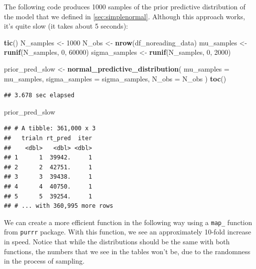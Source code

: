 \documentclass[12pt,]{krantz}
\newenvironment{Shaded}{\begin{snugshade}}{\end{snugshade}}
\newcommand{\KeywordTok}[1]{\textcolor[rgb]{0.13,0.29,0.53}{\textbf{#1}}}
\newcommand{\DataTypeTok}[1]{\textcolor[rgb]{0.13,0.29,0.53}{#1}}
\newcommand{\DecValTok}[1]{\textcolor[rgb]{0.00,0.00,0.81}{#1}}
\newcommand{\StringTok}[1]{\textcolor[rgb]{0.31,0.60,0.02}{#1}}
\newcommand{\NormalTok}[1]{#1}
\theoremstyle{definition}
\theoremstyle{definition}
\theoremstyle{definition}
\theoremstyle{remark}
\begin{document}
The following code produces 1000 samples of the prior predictive
distribution of the model that we defined in \ref{sec:simplenormal}.
Although this approach works, it's quite slow (it takes about 5
seconds):

\begin{Shaded}
\begin{Highlighting}[]
\KeywordTok{tic}\NormalTok{()}
\NormalTok{N_samples <-}\StringTok{ }\DecValTok{1000}
\NormalTok{N_obs <-}\StringTok{ }\KeywordTok{nrow}\NormalTok{(df_noreading_data)}
\NormalTok{mu_samples <-}\StringTok{ }\KeywordTok{runif}\NormalTok{(N_samples, }\DecValTok{0}\NormalTok{, }\DecValTok{60000}\NormalTok{)}
\NormalTok{sigma_samples <-}\StringTok{ }\KeywordTok{runif}\NormalTok{(N_samples, }\DecValTok{0}\NormalTok{, }\DecValTok{2000}\NormalTok{)}

\NormalTok{prior_pred_slow <-}\StringTok{ }\KeywordTok{normal_predictive_distribution}\NormalTok{(}
  \DataTypeTok{mu_samples =}\NormalTok{ mu_samples,}
  \DataTypeTok{sigma_samples =}\NormalTok{ sigma_samples,}
  \DataTypeTok{N_obs =}\NormalTok{ N_obs}
\NormalTok{)}
\KeywordTok{toc}\NormalTok{()}
\end{Highlighting}
\end{Shaded}

\begin{verbatim}
## 3.678 sec elapsed
\end{verbatim}

\begin{Shaded}
\begin{Highlighting}[]
\NormalTok{prior_pred_slow}
\end{Highlighting}
\end{Shaded}

\begin{verbatim}
## # A tibble: 361,000 x 3
##   trialn rt_pred  iter
##    <dbl>   <dbl> <dbl>
## 1      1  39942.     1
## 2      2  42751.     1
## 3      3  39438.     1
## 4      4  40750.     1
## 5      5  39254.     1
## # ... with 360,995 more rows
\end{verbatim}

We can create a more efficient function in the following way using a
\texttt{map\_} function from \texttt{purrr} package. With this function,
we see an approximately 10-fold increase in speed. Notice that while the
distributions should be the same with both functions, the numbers that
we see in the tables won't be, due to the randomness in the process of
sampling.
\end{document}
